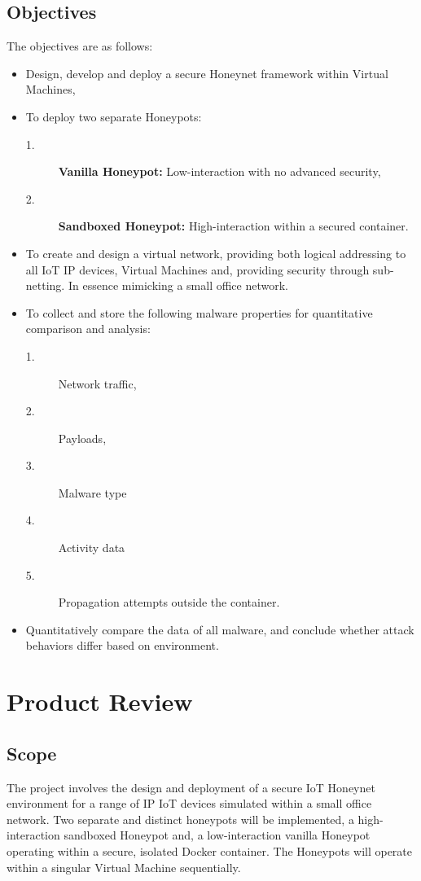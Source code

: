 \documentclass[a4paper,12pt,oneside]{book}			%
\begin{document}
\subsection{Objectives}\label{sec:objectives}
The objectives are as follows:
\begin{itemize}

	\item Design, develop and deploy a secure Honeynet framework within Virtual Machines,
	\item To deploy two separate Honeypots:
		\begin{description}
		\item[1.] \textbf{Vanilla Honeypot:} Low-interaction with no advanced security,
		\item[2.] \textbf{Sandboxed Honeypot:} High-interaction within a secured container.
		\end{description}
	\item To create and design a virtual network, providing both logical addressing to all IoT IP devices, Virtual Machines and, providing security through sub-netting. In essence mimicking a small office network.
	\item To collect and store the following malware properties for quantitative comparison and analysis:
		\begin{description}
		\item[1.] Network traffic,
		\item[2.] Payloads,
		\item[3.] Malware type
		\item[4.] Activity data
		\item[5.] Propagation attempts outside the container.
		\end{description}
	\item Quantitatively compare the data of all malware, and conclude whether attack behaviors differ based on environment. 
\end{itemize}

\section{Product Review}\label{sec:productReview}

\subsection{Scope}\label{sec:scope}

The project involves the design and deployment of a secure IoT Honeynet environment for a range of IP IoT devices simulated within a small office network. Two separate and distinct honeypots will be implemented, a high-interaction sandboxed Honeypot and, a low-interaction vanilla Honeypot operating within a secure, isolated Docker container. The Honeypots will operate within a singular Virtual Machine sequentially.
\end{document}
